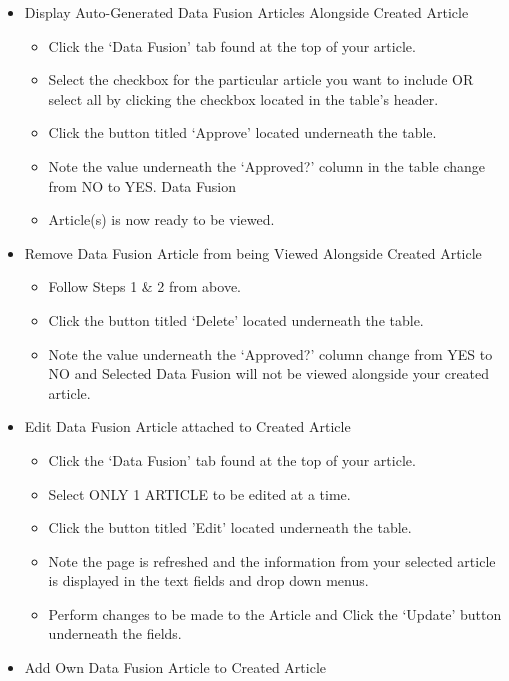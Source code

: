 \documentclass[10pt]{article} %
\begin{document}
\begin{itemize}
\item Display Auto-Generated Data Fusion Articles Alongside Created Article
	\begin{itemize}
	\itemindent 10pt
	\item Click the ‘Data Fusion’ tab found at the top of your article.
	\item Select the checkbox for the particular article you want to include OR select all by clicking the checkbox located in the table’s header.
	\item Click the button titled ‘Approve’ located underneath the table.
	\item Note the value underneath the ‘Approved?’ column in the table change from NO to YES. Data Fusion 	\item Article(s) is now ready to be viewed.
	\end{itemize}
\item Remove Data Fusion Article from being Viewed Alongside Created Article
	\begin{itemize}
	\itemindent 10pt
    	\item Follow Steps 1 \& 2 from above.
    	\item Click the button titled ‘Delete’ located underneath the table.
	\item Note the value underneath the ‘Approved?’ column change from YES to NO and Selected Data Fusion will not be viewed alongside your created article.
	\end{itemize}
\item Edit Data Fusion Article attached to Created Article
	\begin{itemize}
	\itemindent 10pt
    	\item Click the ‘Data Fusion’ tab found at the top of your article.
    	\item Select ONLY 1 ARTICLE to be edited at a time.
	\item Click the button titled ’Edit’ located underneath the table.
	\item Note the page is refreshed and the information from your selected article is displayed in the text fields and drop down menus.
	\item Perform changes to be made to the Article and Click the ‘Update’ button underneath the fields.
	\end{itemize}
\item Add Own Data Fusion Article to Created Article
	\begin{itemize}
	\itemindent 10pt

\end{itemize}
\end{itemize}
\end{document}
